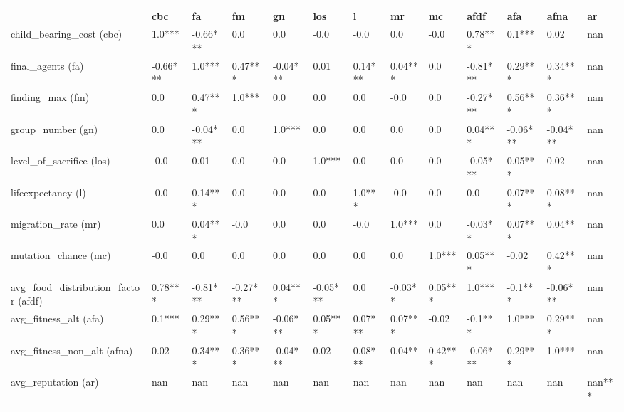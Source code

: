 \begin{tabular}{lllllllllllll}
\toprule
{} &       cbc &        fa &        fm &        gn &       los &        l &       mr &       mc &      afdf &       afa &      afna &      ar \\
\midrule
child\_bearing\_cost (cbc)            &    1.0*** &  -0.66*** &       0.0 &       0.0 &      -0.0 &     -0.0 &      0.0 &     -0.0 &   0.78*** &    0.1*** &      0.02 &     nan \\
final\_agents (fa)                   &  -0.66*** &    1.0*** &   0.47*** &  -0.04*** &      0.01 &  0.14*** &  0.04*** &      0.0 &  -0.81*** &   0.29*** &   0.34*** &     nan \\
finding\_max (fm)                    &       0.0 &   0.47*** &    1.0*** &       0.0 &       0.0 &      0.0 &     -0.0 &      0.0 &  -0.27*** &   0.56*** &   0.36*** &     nan \\
group\_number (gn)                   &       0.0 &  -0.04*** &       0.0 &    1.0*** &       0.0 &      0.0 &      0.0 &      0.0 &   0.04*** &  -0.06*** &  -0.04*** &     nan \\
level\_of\_sacrifice (los)            &      -0.0 &      0.01 &       0.0 &       0.0 &    1.0*** &      0.0 &      0.0 &      0.0 &  -0.05*** &   0.05*** &      0.02 &     nan \\
lifeexpectancy (l)                  &      -0.0 &   0.14*** &       0.0 &       0.0 &       0.0 &   1.0*** &     -0.0 &      0.0 &       0.0 &   0.07*** &   0.08*** &     nan \\
migration\_rate (mr)                 &       0.0 &   0.04*** &      -0.0 &       0.0 &       0.0 &     -0.0 &   1.0*** &      0.0 &   -0.03** &   0.07*** &    0.04** &     nan \\
mutation\_chance (mc)                &      -0.0 &       0.0 &       0.0 &       0.0 &       0.0 &      0.0 &      0.0 &   1.0*** &   0.05*** &     -0.02 &   0.42*** &     nan \\
avg\_food\_distribution\_factor (afdf) &   0.78*** &  -0.81*** &  -0.27*** &   0.04*** &  -0.05*** &      0.0 &  -0.03** &  0.05*** &    1.0*** &   -0.1*** &  -0.06*** &     nan \\
avg\_fitness\_alt (afa)               &    0.1*** &   0.29*** &   0.56*** &  -0.06*** &   0.05*** &  0.07*** &  0.07*** &    -0.02 &   -0.1*** &    1.0*** &   0.29*** &     nan \\
avg\_fitness\_non\_alt (afna)          &      0.02 &   0.34*** &   0.36*** &  -0.04*** &      0.02 &  0.08*** &   0.04** &  0.42*** &  -0.06*** &   0.29*** &    1.0*** &     nan \\
avg\_reputation (ar)                 &       nan &       nan &       nan &       nan &       nan &      nan &      nan &      nan &       nan &       nan &       nan &  nan*** \\
\bottomrule
\end{tabular}
